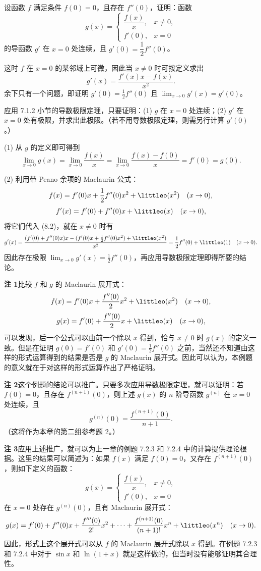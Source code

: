 \begin{xexample}[8.1.9]
设函数 $f$ 满足条件 $f(0)=0$，且存在 $f''(0)$，证明：函数
\[
  g(x)=
  \begin{cases}
    \dfrac{f(x)}{x}, & x\ne0,\\
    f'(0), & x=0
  \end{cases}
\]
的导函数 $g'$ 在 $x=0$ 处连续，且 $g'(0)=\dfrac12f''(0)$。
\end{xexample}
\begin{xsolution}
这时 $f$ 在 $x=0$ 的某邻域上可微，因此当 $x\ne0$ 时可按定义求出
\begin{equation}
  g'(x)=\frac{f'(x)x-f(x)}{x^2}.
  \tag{8.2}
  \label{eq:8.2}
\end{equation}
余下只有一个问题，即证明 $g'(0)=\frac12f''(0)$ 且 $\lim_{x\to0}g'(x)=g'(0)$。

应用 7.1.2 小节的导数极限定理，只要证明：(1) $g$ 在 $x=0$ 处连续；(2) $g'$ 在 $x=0$ 处有极限，并求出此极限。（若不用导数极限定理，则需另行计算 $g'(0)$。）

(1) 从 $g$ 的定义即可得到
\[
  \lim_{x\to0}g(x)=\lim_{x\to0}\frac{f(x)}{x}
  =\lim_{x\to0}\frac{f(x)-f(0)}x=f'(0)=g(0).
\]

(2) 利用带 Peano 余项的 Maclaurin 公式：
\[
  f(x)=f'(0)x+\frac12f''(0)x^2+\littleo(x^2)\quad(x\to0),
\]
\[
  f'(x)=f'(0)+f''(0)x+\littleo(x)\quad(x\to0),
\]
将它们代入 (8.2)，就在 $x\ne0$ 时有
\[
  g'(x)=\frac{(f'(0)+f''(0)x)x-(f'(0)x+\frac12f''(0)x^2)+\littleo(x^2)}{x^2}
  =\frac12f''(0)+\littleo(1)\quad(x\to0).
\]
因此存在极限 $\lim_{x\to0}g'(x)=\frac12f''(0)$，再应用导数极限定理即得所要的结论。

\begin{xremark}
\textbf{注 1}\quad 比较 $f$ 和 $g$ 的 Maclaurin 展开式：
\[
  f(x)=f'(0)x+\frac{f''(0)}2x^2+\littleo(x^2)\quad(x\to0),
\]
\[
  g(x)=f'(0)+\frac{f''(0)}2x+\littleo(x)\quad(x\to0),
\]
可以发现，后一个公式可以由前一个除以 $x$ 得到，恰与 $x\ne0$ 时 $g(x)$ 的定义一致。但是在证明 $g(0)=f'(0)$ 和 $g'(0)=\frac12f''(0)$ 之前，当然还不知道由这样的形式运算得到的结果是否是 $g$ 的 Maclaurin 展开式。因此可以认为，本例题的意义就在于对这样的形式运算作出了严格证明。

\textbf{注 2}\quad 这个例题的结论可以推广。只要多次应用导数极限定理，就可以证明：若 $f(0)=0$，且存在 $f^{(n+1)}(0)$，则上述 $g(x)$ 的 $n$ 阶导函数 $g^{(n)}$ 在 $x=0$ 处连续，且
\[
  g^{(n)}(0)=\frac{f^{(n+1)}(0)}{n+1}.
\]
（这将作为本章的第二组参考题 2。）

\textbf{注 3}\quad 应用上述推广，就可以为上一章的例题 7.2.3 和 7.2.4 中的计算提供理论根据。这里的结果可以简述为：如果 $f(x)$ 满足 $f(0)=0$，又存在 $f^{(n+1)}(0)$，则如下定义的函数：
\[
  g(x)=
  \begin{cases}
    \dfrac{f(x)}{x}, & x\ne0,\\
    f'(0), & x=0
  \end{cases}
\]
在 $x=0$ 处存在 $g^{(n)}(0)$，且有 Maclaurin 展开式：
\[
  g(x)=f'(0)+f''(0)x+\frac{f'''(0)}{2!}x^2+\cdots
  +\frac{f^{(n+1)}(0)}{(n+1)!}x^n+\littleo(x^n)\quad(x\to0).
\]
因此，形式上这个展开式可以从 $f$ 的 Maclaurin 展开式除以 $x$ 得到。在例题 7.2.3 和 7.2.4 中对于 $\sin x$ 和 $\ln(1+x)$ 就是这样做的，但当时没有能够证明其合理性。
\end{xremark}
\end{xsolution}

